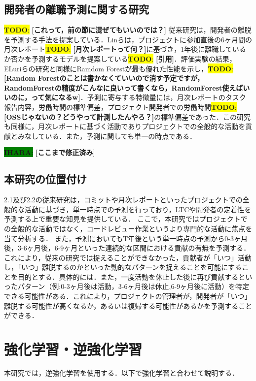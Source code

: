 \documentclass[submit,techrep,noauthor]{ipsj}
\newcommand{\todo}[1]{\colorbox{yellow}{{\bf TODO}:}{\color{red} {\textbf{[#1]}}}}
\newcommand{\ihara}[1]{\colorbox{green}{{\bf IHARA}:}{\color{blue} {\textbf{[#1]}}}}
\begin{document}
\subsection{開発者の離職予測に関する研究}

\todo{これって，前の節に混ぜてもいいのでは？}
従来研究は，開発者の離脱を予測する手法を提案している．Linらは，プロジェクトに参加直後の6ヶ月間の月次レポート\todo{月次レポートって何？}に基づき，1年後に離職しているか否かを予測するモデルを提案している\todo{引用}．評価実験の結果，ELuriらの研究と同様にRamdom Forestが最も優れた性能を示し，\todo{Random Forestのことは書かなくていいので消す予定ですが，RandomForestの精度がこんなに良いって書くなら，RandomForest使えばいいのに，って気になるw}．予測に寄与する特徴量には，月次レポートのタスク報告内容，労働時間の標準偏差，プロジェクト開発者での労働時間\todo{OSSじゃないの？どうやって計測したんやろ？}の標準偏差であった．この研究も同様に，月次レポートに基づく活動でありプロジェクトでの全般的な活動を貢献とみなしている．また，予測に関しても単一の時点である．

\ihara{ここまで修正済み}

\subsection{本研究の位置付け}
2.1及び2.2の従来研究は，コミットや月次レポートといったプロジェクトでの全般的な活動に基づき，単一時点での予測を行っており，LTCや開発者の定着性を予測する上で重要な知見を提供している．
ここで，本研究ではプロジェクトでの全般的な活動ではなく，コードレビュー作業というより専門的な活動に焦点を当て分析する．
また，予測においてもT年後という単一時点の予測から0-3ヶ月後，3-6ヶ月後，6-9ヶ月といった連続的な区間における貢献の有無を予測する．これにより，従来の研究では捉えることができなかった，貢献者が「いつ」活動し，「いつ」離脱するのかといった動的なパターンを捉えることを可能にすることを目的とする．具体的には．また，一度活動を休止した後に再び貢献するといったパターン（例:0-3ヶ月後は活動，3-6ヶ月後は休止,6-9ヶ月後に活動）を特定できる可能性がある．これにより，プロジェクトの管理者が，開発者が「いつ」離脱する可能性が高くなるか，あるいは復帰する可能性があるかを予測することができる．

\label{sec:ml}
\section{強化学習・逆強化学習}

本研究では，逆強化学習を使用する．以下で強化学習と合わせて説明する．
\end{document}
